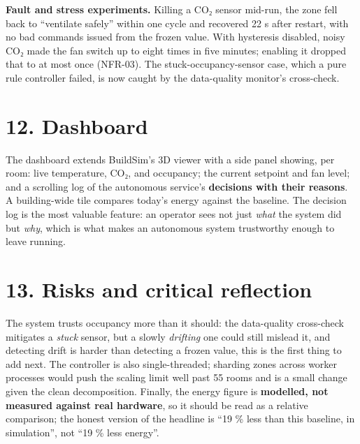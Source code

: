 \documentclass[
  11pt,
]{article}
\begin{document}
\textbf{Fault and stress experiments.} Killing a CO₂ sensor mid-run, the
zone fell back to ``ventilate safely'' within one cycle and recovered 22
s after restart, with no bad commands issued from the frozen value. With
hysteresis disabled, noisy CO₂ made the fan switch up to eight times in
five minutes; enabling it dropped that to at most once (NFR-03). The
stuck-occupancy-sensor case, which a pure rule controller failed, is now caught by the data-quality monitor's cross-check.

\hypertarget{dashboard}{%
\section{12. Dashboard}\label{dashboard}}

The dashboard extends BuildSim's 3D viewer with a side panel showing,
per room: live temperature, CO₂, and occupancy; the current setpoint and
fan level; and a scrolling log of the autonomous service's
\textbf{decisions with their reasons}. A building-wide tile compares
today's energy against the baseline. The decision log is the most valuable feature: an operator sees not just \emph{what} the system
did but \emph{why}, which is what makes an autonomous system trustworthy
enough to leave running.

\hypertarget{risks-and-critical-reflection}{%
\section{13. Risks and critical
reflection}\label{risks-and-critical-reflection}}

The system trusts occupancy more than it should: the data-quality
cross-check mitigates a \emph{stuck} sensor, but a slowly
\emph{drifting} one could still mislead it, and detecting drift is
harder than detecting a frozen value, this is the first thing to add next. The controller is also single-threaded; sharding zones
across worker processes would push the scaling limit well past 55 rooms
and is a small change given the clean decomposition. Finally, the energy figure is \textbf{modelled, not measured against real hardware}, so it
should be read as a relative comparison; the honest version of the headline is ``19 \% less than this baseline, in simulation'', not ``19
\% less energy''.
\end{document}

